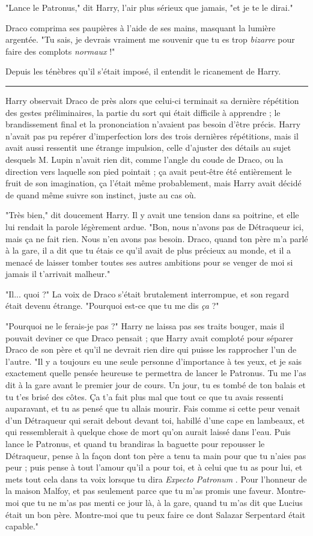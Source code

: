 "Lance le Patronus," dit Harry, l'air plus sérieux que jamais, "et je te le dirai."

Draco comprima ses paupières à l'aide de ses mains, masquant la lumière argentée. "Tu sais, je devrais vraiment me souvenir que tu es trop \emph{bizarre } pour faire des complots \emph{normaux } !"

Depuis les ténèbres qu'il s'était imposé, il entendit le ricanement de Harry.
\par\noindent\rule{\textwidth}{0.4pt}
Harry observait Draco de près alors que celui-ci terminait sa dernière répétition des gestes préliminaires, la partie du sort qui était difficile à apprendre ; le brandissement final et la prononciation n'avaient pas besoin d'être précis. Harry n'avait pas pu repérer d'imperfection lors des trois dernières répétitions, mais il avait aussi ressentit une étrange impulsion, celle d'ajuster des détails au sujet desquels M. Lupin n'avait rien dit, comme l'angle du coude de Draco, ou la direction vers laquelle son pied pointait ; ça avait peut-être été entièrement le fruit de son imagination, ça l'était même probablement, mais Harry avait décidé de quand même suivre son instinct, juste au cas où.

"Très bien," dit doucement Harry. Il y avait une tension dans sa poitrine, et elle lui rendait la parole légèrement ardue. "Bon, nous n'avons pas de Détraqueur ici, mais ça ne fait rien. Nous n'en avons pas besoin. Draco, quand ton père m'a parlé à la gare, il a dit que tu étais ce qu'il avait de plus précieux au monde, et il a menacé de laisser tomber toutes ses autres ambitions pour se venger de moi si jamais il t'arrivait malheur."

"Il... quoi ?" La voix de Draco s'était brutalement interrompue, et son regard était devenu étrange. "Pourquoi est-ce que tu me dis \emph{ça } ?"

"Pourquoi ne le ferais-je pas ?" Harry ne laissa pas ses traits bouger, mais il pouvait deviner ce que Draco pensait ; que Harry avait comploté pour séparer Draco de son père et qu'il ne devrait rien dire qui puisse les rapprocher l'un de l'autre. "Il y a toujours eu une seule personne d'importance à tes yeux, et je sais exactement quelle pensée heureuse te permettra de lancer le Patronus. Tu me l'as dit à la gare avant le premier jour de cours. Un jour, tu es tombé de ton balais et tu t'es brisé des côtes. Ça t'a fait plus mal que tout ce que tu avais ressenti auparavant, et tu as pensé que tu allais mourir. Fais comme si cette peur venait d'un Détraqueur qui serait debout devant toi, habillé d'une cape en lambeaux, et qui ressemblerait à quelque chose de mort qu'on aurait laissé dans l'eau. Puis lance le Patronus, et quand tu brandiras la baguette pour repousser le Détraqueur, pense à la façon dont ton père a tenu ta main pour que tu n'aies pas peur ; puis pense à tout l'amour qu'il a pour toi, et à celui que tu as pour lui, et mets tout cela dans ta voix lorsque tu dira \emph{Expecto Patronum} . Pour l'honneur de la maison Malfoy, et pas seulement parce que tu m'as promis une faveur. Montre-moi que tu ne m'as pas menti ce jour là, à la gare, quand tu m'as dit que Lucius était un bon père. Montre-moi que tu peux faire ce dont Salazar Serpentard était capable."


